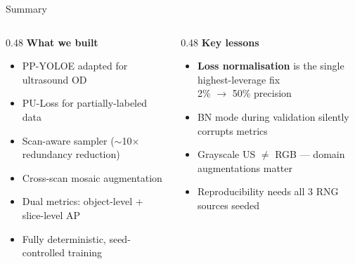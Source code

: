 \documentclass[aspectratio=169, 10pt]{beamer}
\begin{document}
\begin{frame}{Summary}
  \begin{columns}[T]
    \begin{column}{0.48\textwidth}
      \textbf{What we built}
      \begin{itemize}\small
        \item PP-YOLOE adapted for ultrasound OD
        \item PU-Loss for partially-labeled data
        \item Scan-aware sampler ($\sim$10$\times$ redundancy reduction)
        \item Cross-scan mosaic augmentation
        \item Dual metrics: object-level + slice-level AP
        \item Fully deterministic, seed-controlled training
      \end{itemize}
    \end{column}
    \begin{column}{0.48\textwidth}
      \textbf{Key lessons}
      \begin{itemize}\small
        \item \textbf{Loss normalisation} is the single highest-leverage fix\\
              {\color{bad}2\%} $\to$ {\color{good}50\%} precision
        \item BN mode during validation silently corrupts metrics
        \item Grayscale US $\neq$ RGB — domain augmentations matter
        \item Reproducibility needs all 3 RNG sources seeded
      \end{itemize}
    \end{column}
  \end{columns}
\end{frame}

\end{document}
